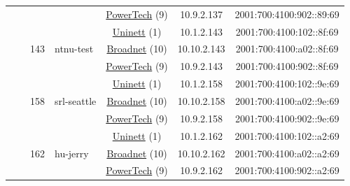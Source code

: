 \begin{small}
\begin{center}
\begin{longtable}{|c|c|c|c|c|c|c|c|}
  &  &  &  & \multicolumn{2}{|c|}{\tiny{\href{http://www.powertech.no}{PowerTech} (9)}} & \tiny{10.9.2.137} & \tiny{2001:700:4100:902::89:69} \\* \cline{3-3}\cline{4-4}\cline{5-5}\cline{6-6}\cline{7-7}\cline{8-8}
  &  & \multirow{3}{*}{\tiny{143}} & \multicolumn{1}{|l|}{\multirow{3}{*}{\tiny{ntnu-test}}} & \multicolumn{2}{|c|}{\tiny{\href{https://www.uninett.no}{Uninett} (1)}} & \tiny{10.1.2.143} & \tiny{2001:700:4100:102::8f:69} \\* \cline{5-5}\cline{6-6}\cline{7-7}\cline{8-8}
  &  &  &  & \multicolumn{2}{|c|}{\tiny{\href{https://www.broadnet.no}{Broadnet} (10)}} & \tiny{10.10.2.143} & \tiny{2001:700:4100:a02::8f:69} \\* \cline{5-5}\cline{6-6}\cline{7-7}\cline{8-8}
  &  &  &  & \multicolumn{2}{|c|}{\tiny{\href{http://www.powertech.no}{PowerTech} (9)}} & \tiny{10.9.2.143} & \tiny{2001:700:4100:902::8f:69} \\* \cline{3-3}\cline{4-4}\cline{5-5}\cline{6-6}\cline{7-7}\cline{8-8}
  &  & \multirow{3}{*}{\tiny{158}} & \multicolumn{1}{|l|}{\multirow{3}{*}{\tiny{srl-seattle}}} & \multicolumn{2}{|c|}{\tiny{\href{https://www.uninett.no}{Uninett} (1)}} & \tiny{10.1.2.158} & \tiny{2001:700:4100:102::9e:69} \\* \cline{5-5}\cline{6-6}\cline{7-7}\cline{8-8}
  &  &  &  & \multicolumn{2}{|c|}{\tiny{\href{https://www.broadnet.no}{Broadnet} (10)}} & \tiny{10.10.2.158} & \tiny{2001:700:4100:a02::9e:69} \\* \cline{5-5}\cline{6-6}\cline{7-7}\cline{8-8}
  &  &  &  & \multicolumn{2}{|c|}{\tiny{\href{http://www.powertech.no}{PowerTech} (9)}} & \tiny{10.9.2.158} & \tiny{2001:700:4100:902::9e:69} \\* \cline{3-3}\cline{4-4}\cline{5-5}\cline{6-6}\cline{7-7}\cline{8-8}
  &  & \multirow{3}{*}{\tiny{162}} & \multicolumn{1}{|l|}{\multirow{3}{*}{\tiny{hu-jerry}}} & \multicolumn{2}{|c|}{\tiny{\href{https://www.uninett.no}{Uninett} (1)}} & \tiny{10.1.2.162} & \tiny{2001:700:4100:102::a2:69} \\* \cline{5-5}\cline{6-6}\cline{7-7}\cline{8-8}
  &  &  &  & \multicolumn{2}{|c|}{\tiny{\href{https://www.broadnet.no}{Broadnet} (10)}} & \tiny{10.10.2.162} & \tiny{2001:700:4100:a02::a2:69} \\* \cline{5-5}\cline{6-6}\cline{7-7}\cline{8-8}
  &  &  &  & \multicolumn{2}{|c|}{\tiny{\href{http://www.powertech.no}{PowerTech} (9)}} & \tiny{10.9.2.162} & \tiny{2001:700:4100:902::a2:69} \\* \cline{3-3}\cline{4-4}\cline{5-5}\cline{6-6}\cline{7-7}\cline{8-8}

\end{longtable}
\end{center}
\end{small}

